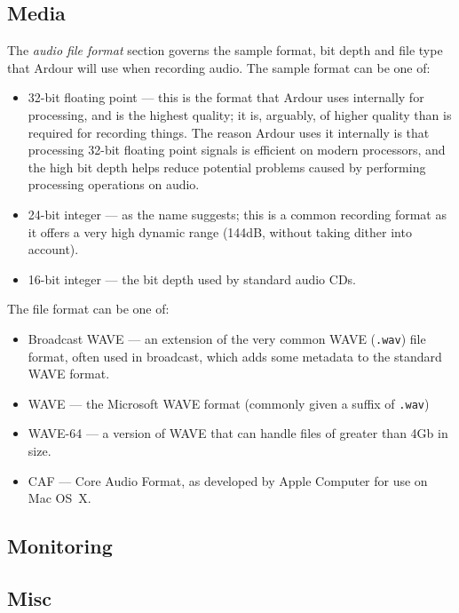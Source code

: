 \documentclass[10pt,a4paper]{book}
\begin{document}
\subsection{Media}
\label{sec:session-properties-media}

The \emph{audio file format} section governs the sample format, bit
depth and file type that Ardour will use when recording audio.  The
sample format can be one of:

\begin{itemize}
\item 32-bit floating point --- this is the format that Ardour uses
  internally for processing, and is the highest quality; it is,
  arguably, of higher quality than is required for recording things.
  The reason Ardour uses it internally is that processing 32-bit
  floating point signals is efficient on modern processors, and the
  high bit depth helps reduce potential problems caused by performing
  processing operations on audio.
\item 24-bit integer --- as the name suggests; this is a common
  recording format as it offers a very high dynamic range (144dB,
  without taking dither into account).
\item 16-bit integer --- the bit depth used by standard audio CDs.
\end{itemize}

The file format can be one of:

\begin{itemize}
\item Broadcast WAVE --- an extension of the very common WAVE
  (\texttt{.wav}) file format, often used in broadcast, which adds
  some metadata to the standard WAVE format.
\item WAVE --- the Microsoft WAVE format (commonly given a suffix of \texttt{.wav})
\item WAVE-64 --- a version of WAVE that can handle files of greater than 4Gb in size.
\item CAF --- Core Audio Format, as developed by Apple Computer for use on Mac OS~X.
\end{itemize}

\subsection{Monitoring}
\subsection{Misc}
\end{document}
